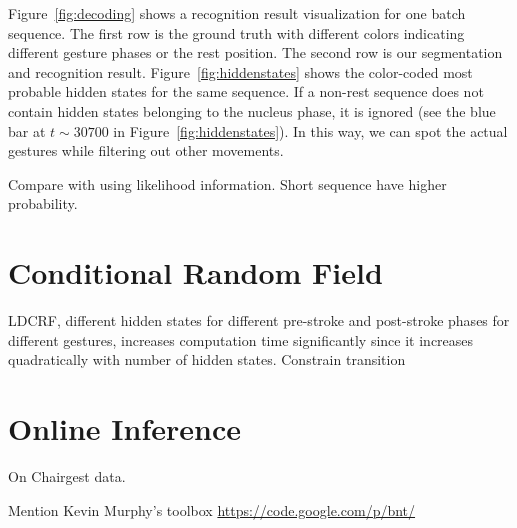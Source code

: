 Figure~\ref{fig:decoding} shows a recognition result visualization for one batch sequence. The first
row is the ground truth with different colors indicating different gesture phases or the rest position. 
The second row is our segmentation and recognition result.
Figure~\ref{fig:hiddenstates} shows the color-coded most probable hidden states
for the same sequence.
If a non-rest sequence does not contain hidden states belonging to the nucleus
phase, it is ignored (see the blue bar at $t\sim 30700$ in Figure~\ref{fig:hiddenstates}).
In this way, we can spot the actual gestures while filtering out other movements.

Compare with using likelihood information. Short sequence have higher
probability.

\section{Conditional Random Field}
LDCRF, different hidden states for different pre-stroke and post-stroke phases
for different gestures, increases computation time significantly since it
increases quadratically with number of hidden states.
Constrain transition

\section{Online Inference}
On Chairgest data.

Mention Kevin Murphy's toolbox \url{https://code.google.com/p/bnt/}